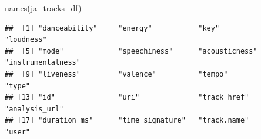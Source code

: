 \documentclass[
]{article}
\newenvironment{Shaded}{\begin{snugshade}}{\end{snugshade}}
\newcommand{\FunctionTok}[1]{\textcolor[rgb]{0.00,0.00,0.00}{#1}}
\newcommand{\NormalTok}[1]{#1}
\begin{document}
\begin{Shaded}
\begin{Highlighting}[]
\FunctionTok{names}\NormalTok{(ja\_tracks\_df)}
\end{Highlighting}
\end{Shaded}

\begin{verbatim}
##  [1] "danceability"     "energy"           "key"              "loudness"        
##  [5] "mode"             "speechiness"      "acousticness"     "instrumentalness"
##  [9] "liveness"         "valence"          "tempo"            "type"            
## [13] "id"               "uri"              "track_href"       "analysis_url"    
## [17] "duration_ms"      "time_signature"   "track.name"       "user"
\end{verbatim}
\end{document}

